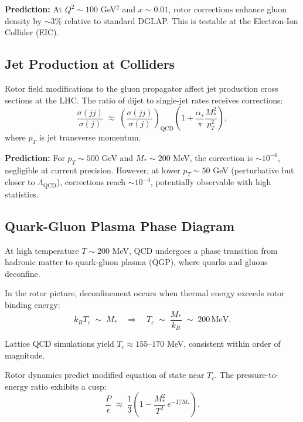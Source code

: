 \documentclass[11pt,a4paper]{article}
\theoremstyle{definition}
\theoremstyle{plain}
\theoremstyle{remark}
\begin{document}
\textbf{Prediction:} At $Q^2 \sim 100$ GeV$^2$ and $x \sim 0.01$, rotor corrections enhance gluon density by $\sim 3\%$ relative to standard DGLAP. This is testable at the Electron-Ion Collider (EIC).

\subsection{Jet Production at Colliders}

Rotor field modifications to the gluon propagator affect jet production cross sections at the LHC. The ratio of dijet to single-jet rates receives corrections:
\begin{equation}
\frac{\sigma(jj)}{\sigma(j)} \;\approx\; \left(\frac{\sigma(jj)}{\sigma(j)}\right)_{\mathrm{QCD}}\left(1 + \frac{\alpha_s}{\pi}\frac{M_\ast^2}{p_T^2}\right),
\end{equation}
where $p_T$ is jet transverse momentum.

\textbf{Prediction:} For $p_T \sim 500$ GeV and $M_\ast \sim 200$ MeV, the correction is $\sim 10^{-6}$, negligible at current precision. However, at lower $p_T \sim 50$ GeV (perturbative but closer to $\Lambda_{\mathrm{QCD}}$), corrections reach $\sim 10^{-4}$, potentially observable with high statistics.

\subsection{Quark-Gluon Plasma Phase Diagram}

At high temperature $T \sim 200$ MeV, QCD undergoes a phase transition from hadronic matter to quark-gluon plasma (QGP), where quarks and gluons deconfine.

In the rotor picture, deconfinement occurs when thermal energy exceeds rotor binding energy:
\begin{equation}
k_B T_c \;\sim\; M_\ast \quad\Rightarrow\quad T_c \;\sim\; \frac{M_\ast}{k_B} \;\sim\; 200\,\text{MeV}.
\end{equation}

Lattice QCD simulations yield $T_c \approx 155$--$170$ MeV, consistent within order of magnitude.

Rotor dynamics predict modified equation of state near $T_c$. The pressure-to-energy ratio exhibits a cusp:
\begin{equation}
\frac{P}{\epsilon} \;\approx\; \frac{1}{3}\left(1 - \frac{M_\ast^2}{T^2}\,e^{-T/M_\ast}\right).
\end{equation}
\end{document}
